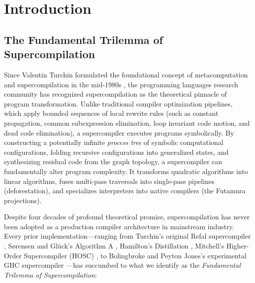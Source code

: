 \chapter{Introduction}
\label{chap:intro}

\section{The Fundamental Trilemma of Supercompilation}
\label{sec:intro:trilemma}

Since Valentin Turchin formulated the foundational concept of metacomputation and supercompilation in the mid-1980s \citep{turchin1986concept}, the programming languages research community has recognized supercompilation as the theoretical pinnacle of program transformation. Unlike traditional compiler optimization pipelines, which apply bounded sequences of local rewrite rules (such as constant propagation, common subexpression elimination, loop invariant code motion, and dead code elimination), a supercompiler executes programs symbolically. By constructing a potentially infinite \emph{process tree} of symbolic computational configurations, folding recursive configurations into generalized states, and synthesizing residual code from the graph topology, a supercompiler can fundamentally alter program complexity. It transforms quadratic algorithms into linear algorithms, fuses multi-pass traversals into single-pass pipelines (deforestation), and specializes interpreters into native compilers (the Futamura projections).

Despite four decades of profound theoretical promise, supercompilation has never been adopted as a production compiler architecture in mainstream industry. Every prior implementation---ranging from Turchin's original Refal supercompiler \citep{turchin1986concept}, S\o{}rensen and Gl\"{u}ck's Algorithm A \citep{sorensen1995algorithm}, Hamilton's Distillation \citep{hamilton2007distillation}, Mitchell's Higher-Order Supercompiler (HOSC) \citep{mitchell2010hosc}, to Bolingbroke and Peyton Jones's experimental GHC supercompiler \citep{bolingbroke2010supercompilation}---has succumbed to what we identify as the \emph{Fundamental Trilemma of Supercompilation}:

